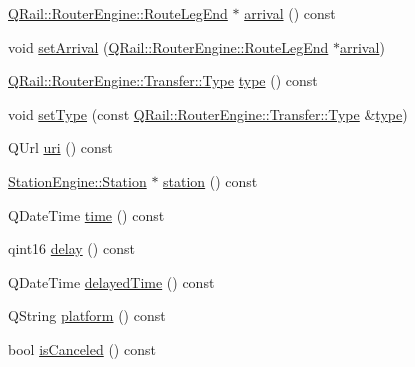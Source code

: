 \begin{DoxyCompactItemize}
\item 
\mbox{\hyperlink{classQRail_1_1RouterEngine_1_1RouteLegEnd}{Q\+Rail\+::\+Router\+Engine\+::\+Route\+Leg\+End}} $\ast$ \mbox{\hyperlink{classQRail_1_1RouterEngine_1_1Transfer_aba50a1ebdec084c649ccf4fe227d13ba}{arrival}} () const
\item 
void \mbox{\hyperlink{classQRail_1_1RouterEngine_1_1Transfer_a75048b3bc70006d55561281efa569acc}{set\+Arrival}} (\mbox{\hyperlink{classQRail_1_1RouterEngine_1_1RouteLegEnd}{Q\+Rail\+::\+Router\+Engine\+::\+Route\+Leg\+End}} $\ast$\mbox{\hyperlink{classQRail_1_1RouterEngine_1_1Transfer_aba50a1ebdec084c649ccf4fe227d13ba}{arrival}})
\item 
\mbox{\hyperlink{classQRail_1_1RouterEngine_1_1Transfer_a5a0b372acbdfb9381fb937bf163edfa6}{Q\+Rail\+::\+Router\+Engine\+::\+Transfer\+::\+Type}} \mbox{\hyperlink{classQRail_1_1RouterEngine_1_1Transfer_a61514c74c7f14ae9626aa4308c95d016}{type}} () const
\item 
void \mbox{\hyperlink{classQRail_1_1RouterEngine_1_1Transfer_a336a593cb84d879794a7ab7275ef6b08}{set\+Type}} (const \mbox{\hyperlink{classQRail_1_1RouterEngine_1_1Transfer_a5a0b372acbdfb9381fb937bf163edfa6}{Q\+Rail\+::\+Router\+Engine\+::\+Transfer\+::\+Type}} \&\mbox{\hyperlink{classQRail_1_1RouterEngine_1_1Transfer_a61514c74c7f14ae9626aa4308c95d016}{type}})
\item 
Q\+Url \mbox{\hyperlink{classQRail_1_1RouterEngine_1_1Transfer_a395e3c3959c104c17052d4fc783c06eb}{uri}} () const
\item 
\mbox{\hyperlink{classQRail_1_1StationEngine_1_1Station}{Station\+Engine\+::\+Station}} $\ast$ \mbox{\hyperlink{classQRail_1_1RouterEngine_1_1Transfer_aa16ed17bef90a4ecdcb7b6c03651b9dd}{station}} () const
\item 
Q\+Date\+Time \mbox{\hyperlink{classQRail_1_1RouterEngine_1_1Transfer_ae6dc48066916082dbd30fa1de56cd66c}{time}} () const
\item 
qint16 \mbox{\hyperlink{classQRail_1_1RouterEngine_1_1Transfer_a0b1d68480dc01278e10db8cc6ecd9de4}{delay}} () const
\item 
Q\+Date\+Time \mbox{\hyperlink{classQRail_1_1RouterEngine_1_1Transfer_a2b54319da738a744f3e1d232e6960979}{delayed\+Time}} () const
\item 
Q\+String \mbox{\hyperlink{classQRail_1_1RouterEngine_1_1Transfer_a17256666f753e0be8601273905a36973}{platform}} () const
\item 
bool \mbox{\hyperlink{classQRail_1_1RouterEngine_1_1Transfer_a2e8de8ed602b5d3eb5bcb38457b36b90}{is\+Canceled}} () const

\end{DoxyCompactItemize}
